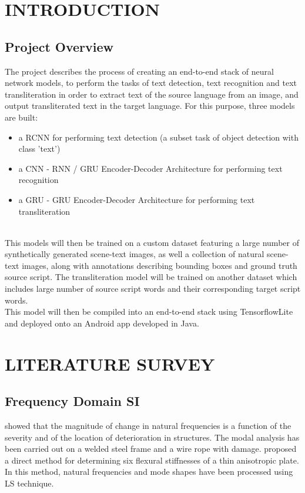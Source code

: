 \documentclass[BTech]{srmuthesis}
\begin{document}
\pagebreak
\clearpage



\chapter{INTRODUCTION}
\label{chap:intro}
\section{Project Overview}
The project describes the process of creating an end-to-end stack of neural network models, to perform the tasks of text detection, text recognition and text transliteration in order to extract text of the source language from an image, and output transliterated text in the target language. For this purpose, three models are built:
\begin{itemize}
\item a \ac{RCNN} for performing text detection (a subset task of object detection with class 'text')
\item a \ac{CNN} - \ac{RNN} / \ac{GRU} Encoder-Decoder Architecture for performing text recognition
\item  a \ac{GRU} - \ac{GRU} Encoder-Decoder Architecture for performing text transliteration
\end{itemize} \\

This models will then be trained on a custom dataset featuring a large number of synthetically generated scene-text images, as well a collection of natural scene-text images, along with annotations describing bounding boxes and ground truth source script. The transliteration model will be trained on another dataset which includes large number of source script words and their corresponding target script words. \\

This model will then be compiled into an end-to-end stack using TensorflowLite and deployed onto an Android app developed in Java. 

 \chapter{LITERATURE SURVEY}
\section{Frequency Domain SI}
\citet{george} showed that the magnitude of change in natural frequencies is a function of the severity and of the location of deterioration in structures. The modal analysis has been carried out on a welded steel frame and a wire rope with damage. \citet{gredia} proposed a direct method for determining six flexural stiffnesses of a thin anisotropic plate. In this method, natural frequencies \citep{Leo} and mode shapes have been processed using \ac{LS} technique.
\end{document}
